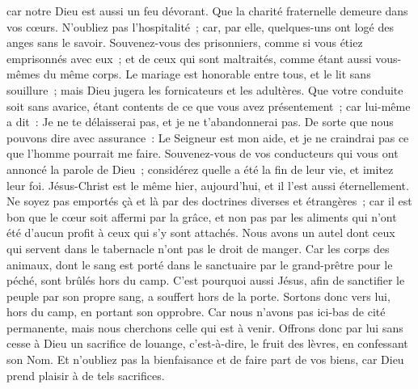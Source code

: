 \begin{multicols}{2}
car notre Dieu est aussi un feu dévorant.
\VerseOne{}Que la charité fraternelle demeure dans vos cœurs.
N'oubliez pas l'hospitalité~; car, par elle, quelques-uns ont logé des anges sans le savoir.
Souvenez-vous des prisonniers, comme si vous étiez emprisonnés avec eux~; et de ceux qui sont maltraités, comme étant aussi vous-mêmes du même corps.
Le mariage est honorable entre tous, et le lit sans souillure~; mais Dieu jugera les fornicateurs et les adultères.
Que votre conduite soit sans avarice, étant contents de ce que vous avez présentement~; car lui-même a dit~: Je ne te délaisserai pas, et je ne t'abandonnerai pas.
De sorte que nous pouvons dire avec assurance~: Le Seigneur est mon aide, et je ne craindrai pas ce que l'homme pourrait me faire.
Souvenez-vous de vos conducteurs qui vous ont annoncé la parole de Dieu~; considérez quelle a été la fin de leur vie, et imitez leur foi.
Jésus-Christ est le même hier, aujourd'hui, et il l'est aussi éternellement.
Ne soyez pas emportés çà et là par des doctrines diverses et étrangères~; car il est bon que le cœur soit affermi par la grâce, et non pas par les aliments qui n'ont été d'aucun profit à ceux qui s'y sont attachés.
Nous avons un autel dont ceux qui servent dans le tabernacle n'ont pas le droit de manger.
Car les corps des animaux, dont le sang est porté dans le sanctuaire par le grand-prêtre pour le péché, sont brûlés hors du camp.
C'est pourquoi aussi Jésus, afin de sanctifier le peuple par son propre sang, a souffert hors de la porte.
Sortons donc vers lui, hors du camp, en portant son opprobre.
Car nous n'avons pas ici-bas de cité permanente, mais nous cherchons celle qui est à venir.
Offrons donc par lui sans cesse à Dieu un sacrifice de louange, c'est-à-dire, le fruit des lèvres, en confessant son Nom.
Et n'oubliez pas la bienfaisance et de faire part de vos biens, car Dieu prend plaisir à de tels sacrifices.

\end{multicols}
